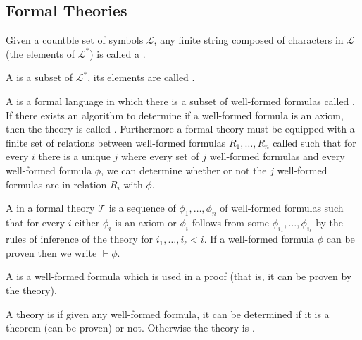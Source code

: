 \documentclass[10pt]{article}
\def\Language{\mathcal{L}}
\def\theory{\mathcal{T}}
\begin{document}
\subsection{Formal Theories}

\begin{defn*}

    Given a countble set of symbols $\Language$, any finite string composed of characters in $\Language$ (the elements of $\Language^*$) is called a .

    A  is a subset of $\Language^*$, its elements are called .

    A  is a formal language in which there is a subset of well-formed formulas called .
    If there exists an algorithm to determine if a well-formed formula is an axiom, then the theory is called .
    Furthermore a formal theory must be equipped with a finite set of relations between well-formed formulas $R_1,\dots,R_n$ called  such that for every $i$ there is a unique $j$
    where every set of $j$ well-formed formulas and every well-formed formula $\phi$, we can determine whether or not the $j$ well-formed formulas are in relation $R_i$ with $\phi$.

\end{defn*}

\begin{defn*}

    A  in a formal theory $\theory$ is a sequence of $\phi_1,\dots,\phi_n$ of well-formed formulas such that for every $i$ either $\phi_i$ is an axiom or $\phi_i$ follows from some
    $\phi_{i_1},\dots,\phi_{i_\ell}$ by the rules of inference of the theory for $i_1,\dots,i_\ell<i$.
    If a well-formed formula $\phi$ can be proven then we write $\vdash\phi$.

    A  is a well-formed formula which is used in a proof (that is, it can be proven by the theory).

    A theory is  if given any well-formed formula, it can be determined if it is a theorem (can be proven) or not.
    Otherwise the theory is .

\end{defn*}
\end{document}
